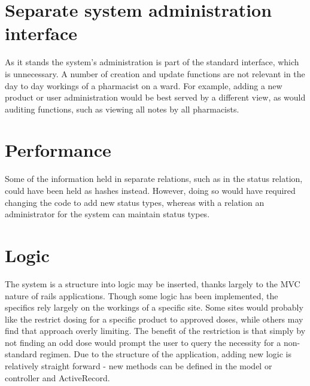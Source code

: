 \documentclass[letterpaper]{amsart}
\begin{document}
\section{Separate system administration interface}
As it stands the system's administration is part of the standard interface, which is unnecessary.  A number of creation and update functions are not relevant in the day to day workings of a pharmacist on a ward.  For example, adding a new product or user administration would be best served by a different view, as would auditing functions, such as viewing all notes by all pharmacists.
\section{Performance}
Some of the information held in separate relations, such as in the status relation, could have been held as hashes instead.  However, doing so would have required changing the code to add new status types, whereas with a relation an administrator for the system can maintain status types.
\section{Logic}
The system is a structure into logic may be inserted, thanks largely to the MVC nature of rails applications.  Though some logic has been implemented, the specifics rely largely on the workings of a specific site.  Some sites would probably like the restrict dosing for a specific product to approved doses, while others may find that approach overly limiting.  The benefit of the restriction is that simply by not finding an odd dose would prompt the user to query the necessity for a non-standard regimen.
Due to the structure of the application, adding new logic is relatively straight forward - new methods can be defined in the model or controller and ActiveRecord. 

\begin{comment}
    Appendices:
    Example of model code generation for pigyard

\end{comment}
\end{document}
